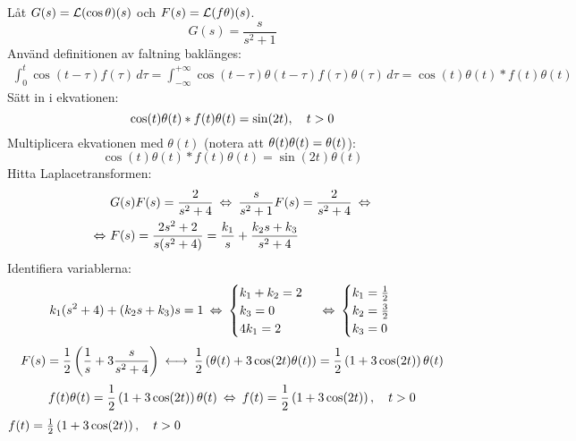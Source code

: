\pagebreak
\begin{task}{6.10}
	Låt $G(s)=\operatorname{\mathcal{L}}(\cos\theta)(s)$ och $F(s)=\operatorname{\mathcal{L}}(f\theta)(s)$.
	\[G(s)=\frac{s}{s^2+1}\]
	Använd definitionen av faltning baklänges:
	\begin{align*}
	\int_{0}^{t}\!\cos(t-\tau)f(\tau)\, d\tau=
	\int_{-\infty}^{+\infty}\!\cos(t-\tau)\theta(t-\tau)f(\tau)\theta(\tau)\, d\tau=
	\cos(t)\theta(t)*f(t)\theta(t)
	\end{align*}
	Sätt in i ekvationen:
	\[\cos(t)\theta(t)*f(t)\theta(t)=\sin(2t), \quad t>0\]
	Multiplicera ekvationen med $\theta(t)$ (notera att $\theta(t)\*\theta(t)=\theta(t)$):
	\[\cos(t)\theta(t)*f(t)\theta(t)=\sin(2t)\theta(t)\]
	Hitta Laplacetransformen:
	\begin{align*}
	&G(s)F(s)=\frac{2}{s^2+4} \lra
	\frac{s}{s^2+1}F(s)=\frac{2}{s^2+4} \lra \\ \lra
	&F(s)=
	\frac{2s^2+2}{s(s^2+4)}=
	\frac{k_1}{s}+\frac{k_2s+k_3}{s^2+4}
	\end{align*}
	Identifiera variablerna:
	\begin{align*}
	&k_1(s^2+4)+(k_2s+k_3)s=1 \lra
	\begin{cases}
	k_1+k_2=2 \\
	k_3=0 \\
	4k_1=2
	\end{cases} \lra
	\begin{cases}
	k_1=\frac{1}{2} \\
	k_2=\frac{3}{2} \\
	k_3=0
	\end{cases}
	\end{align*}
	\begin{align*}
	F(s)=
	\frac{1}{2}\left(\frac{1}{s}+3\frac{s}{s^2+4}\right) \llra
	\frac{1}{2}\left(\theta(t)+3\cos(2t)\theta(t)\right)=
	\frac{1}{2}\left(1+3\cos(2t)\right)\theta(t)
	\end{align*}
	\[f(t)\theta(t)=\frac{1}{2}\left(1+3\cos(2t)\right)\theta(t)\lra
	f(t)=\frac{1}{2}\left(1+3\cos(2t)\right)\cond{t>0}\]
	\ans $f(t)=\frac{1}{2}\left(1+3\cos(2t)\right), \quad t>0$
\end{task}


